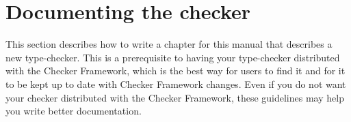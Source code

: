 


\section{Documenting the checker\label{documenting-a-checker}}

This section describes how to write a chapter for this manual that
describes a new type-checker.  This is a prerequisite to having your
type-checker distributed with the Checker Framework, which is the best way
for users to find it and for it to be kept up to date with Checker
Framework changes.  Even if you do not want your checker distributed with
the Checker Framework, these guidelines may help you write better
documentation.

